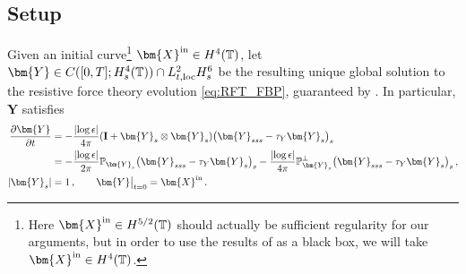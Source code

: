 \documentclass[11pt,reqno]{amsart}
\newcommand{\T}{\mathbb{T}}
\renewcommand{\P}{\mathbb{P}}
\newcommand{\X}{\bm{X}}
\newcommand{\Y}{\bm{Y}}
\newcommand{\p}{\partial}
\newcommand{\abs}[1]{\left\lvert #1 \right\rvert}
\numberwithin{equation}{section}
\theoremstyle{definition}
\begin{document}
\subsection{Setup}
Given an initial curve\footnote{Here $\X^{\rm in}\in H^{5/2}(\T)$ should actually be sufficient regularity for our arguments, but in order to use the results of \cite[Theorem 1.1]{albritton2025rods} as a black box, we will take $\X^{\rm in}\in H^4(\T)$.} $\X^{\rm in}\in H^4(\T)$, let $\Y\in C([0,T];H^4_s(\T))\cap L^2_{t,{\rm loc}}H^6_s$ be the resulting unique global solution to the resistive force theory evolution \eqref{eq:RFT_FBP}, guaranteed by \cite[Theorem~1.1]{albritton2025rods}. In particular, $\Y$ satisfies  
\begin{equation}\label{eq:RFT_Yeqn}
\begin{aligned}
   \frac{\p\Y}{\p t} &= -\frac{\abs{\log\epsilon}}{4\pi}({\bf I}+\Y_s\otimes\Y_s)\big(\Y_{sss}-\tau_Y\Y_s \big)_s\\
   &=-\frac{\abs{\log\epsilon}}{2\pi}\P_{\Y_s}\big(\Y_{sss}-\tau_Y\Y_s \big)_s -\frac{\abs{\log\epsilon}}{4\pi}\P_{\Y_s}^\perp\big(\Y_{sss}-\tau_Y\Y_s \big)_s \,,\\
   \abs{\Y_s}&=1\,,\qquad \Y\big|_{t=0}=\X^{\rm in}\,.
\end{aligned}
 \end{equation} 
\end{document}
